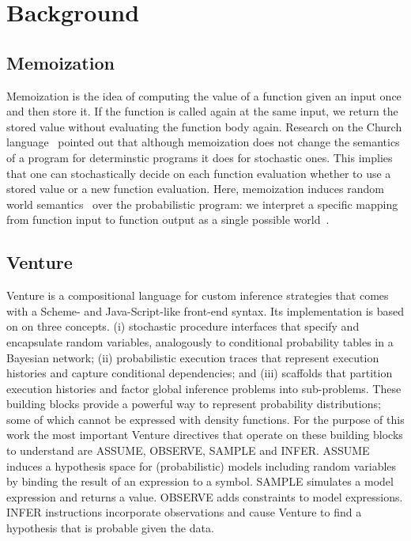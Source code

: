 \documentclass{article} %
\begin{document}
\section{Background}
\subsection{Memoization}
Memoization is the idea of computing the value of a function given an input once and then store it. If the function is called again at the same input, we return the stored value without evaluating the function body again. Research on the Church language~\citep{goodman2008church} pointed out that although memoization does not change the semantics of a program for determinstic programs it does for stochastic ones. This implies that one can stochastically decide on each function evaluation whether to use a stored value or a new function evaluation. Here, memoization induces random world semantics~\citep{poole1993probabilistic,sato1995statistical} over the probabilistic program: we interpret a specific mapping from function input to function output as a single possible world~\citep{mcallester2008random}.






\subsection{Venture}
Venture is a compositional language for custom inference strategies that comes with a Scheme- and Java-Script-like front-end syntax. Its implementation is based on on three concepts. (i) stochastic procedure interfaces that specify and encapsulate random variables, analogously to conditional probability tables in a Bayesian network; (ii) probabilistic execution traces that represent execution histories and capture conditional dependencies; and (iii) scaffolds that partition execution histories and factor global inference problems into sub-problems. These building blocks provide a powerful way to represent probability distributions; some of which cannot be expressed with density functions. For the purpose of this work the most important Venture directives that operate on these building blocks to understand are ASSUME, OBSERVE, SAMPLE and INFER. ASSUME induces a hypothesis space for (probabilistic) models including random variables by binding the result of an expression to a symbol. SAMPLE simulates a model expression and returns a value. OBSERVE adds constraints to model expressions. INFER instructions incorporate observations and cause Venture to find a hypothesis that is probable given the data. 
\end{document}
